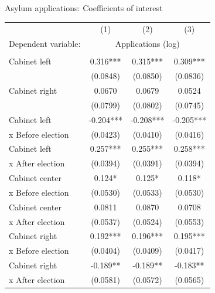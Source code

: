 \documentclass{beamer}
\begin{document}
	\begin{frame}{Asylum applications: Coefficients of interest}
\vspace{-2ex}
\begin{table}
\centering
\footnotesize
\begin{threeparttable}
\begin{tabular}{l*{3}{c}}
\hline\hline
                    &\multicolumn{1}{c}{(1)}&\multicolumn{1}{c}{(2)}&\multicolumn{1}{c}{(3)}\\
Dependent variable:&\multicolumn{3}{c}{Applications (log)}\\[1pt]
\hline\\[-6pt]
Cabinet left          &     0.316*** &     0.315***  &    0.309***           \\
                                        &  (0.0848) &  (0.0850) & (0.0836)          \\[3pt]
Cabinet right         &   0.0670 & 0.0679 & 0.0524          \\
                                        &  (0.0799) & (0.0802) & (0.0745)        \\[3pt]
Cabinet left&  -0.204***& -0.208***& -0.205***\\
x Before election & (0.0423) & (0.0410)& (0.0416)\\[3pt]
Cabinet left &0.257*** &0.255***& 0.258***\\
x After election  &(0.0394)& (0.0391) &(0.0394)\\[3pt]
Cabinet center & 0.124*& 0.125*& 0.118*\\
x Before election &(0.0530)& (0.0533)& (0.0530)\\[3pt]
Cabinet center&  0.0811& 0.0870& 0.0708\\
x After election &(0.0537)& (0.0524)& (0.0553)\\[3pt]
Cabinet right&  0.192***& 0.196***& 0.195***\\
x Before election &(0.0404)& (0.0409) &(0.0417)\\[3pt]
Cabinet right & -0.189**& -0.189** &-0.183**\\
x After election &(0.0581) &(0.0572)& (0.0565)\\[3pt]                                    
\hline
\end{tabular}
\end{threeparttable}
\end{table}
	\end{frame}
\end{document}
